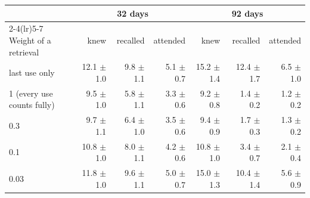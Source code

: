 \begin{tabular}{l r r r r r r}
\toprule
 & \multicolumn{3}{c}{32 days} & \multicolumn{3}{c}{92 days}\\
\cmidrule(lr){2-4}\cmidrule(lr){5-7}
Weight of a retrieval & knew & recalled & attended & knew & recalled & attended\\
\midrule
last use only & 12.1 $\pm$ 1.0 & 9.8 $\pm$ 1.1 & 5.1 $\pm$ 0.7 & 15.2 $\pm$ 1.4 & 12.4 $\pm$ 1.7 & 6.5 $\pm$ 1.0\\
1 (every use counts fully) & 9.5 $\pm$ 1.0 & 5.8 $\pm$ 1.1 & 3.3 $\pm$ 0.6 & 9.2 $\pm$ 0.8 & 1.4 $\pm$ 0.2 & 1.2 $\pm$ 0.2\\
0.3 & 9.7 $\pm$ 1.1 & 6.4 $\pm$ 1.0 & 3.5 $\pm$ 0.6 & 9.4 $\pm$ 0.9 & 1.7 $\pm$ 0.3 & 1.3 $\pm$ 0.2\\
0.1 & 10.8 $\pm$ 1.0 & 8.0 $\pm$ 1.1 & 4.2 $\pm$ 0.6 & 10.8 $\pm$ 1.0 & 3.4 $\pm$ 0.7 & 2.1 $\pm$ 0.4\\
0.03 & 11.8 $\pm$ 1.0 & 9.6 $\pm$ 1.1 & 5.0 $\pm$ 0.7 & 15.0 $\pm$ 1.3 & 10.4 $\pm$ 1.4 & 5.6 $\pm$ 0.9\\
\bottomrule
\end{tabular}
